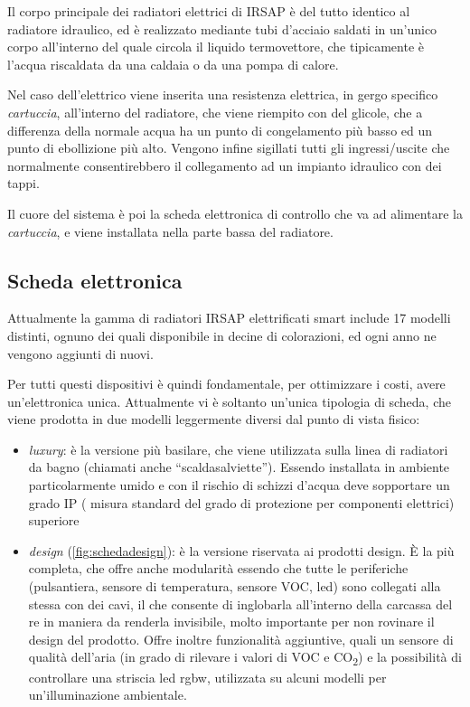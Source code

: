 \documentclass[12pt,a4paper,twoside,titlepage]{book}
\begin{document}
Il corpo principale dei radiatori elettrici di IRSAP è del tutto identico al radiatore idraulico,
ed è realizzato mediante tubi d'acciaio saldati in un'unico corpo all'interno del quale circola 
il liquido termovettore, che tipicamente è l'acqua riscaldata da una caldaia o da una pompa di calore. 

Nel caso dell'elettrico viene inserita una resistenza elettrica, in gergo specifico \textit{cartuccia},
all'interno del radiatore, che viene riempito con del glicole, che a differenza della normale acqua 
ha un punto di congelamento più basso ed un punto di ebollizione più alto. Vengono infine sigillati 
tutti gli ingressi/uscite che normalmente consentirebbero il collegamento ad un impianto idraulico con dei tappi. 

Il cuore del sistema è poi la scheda elettronica di controllo che va ad alimentare la \textit{cartuccia},
e viene installata nella parte bassa del radiatore. 

\subsection{Scheda elettronica}

Attualmente la gamma di radiatori IRSAP elettrificati smart include 17 modelli distinti, 
ognuno dei quali disponibile in decine di colorazioni, ed ogni anno ne vengono aggiunti di nuovi. 

Per tutti questi dispositivi è quindi fondamentale, per ottimizzare i costi, avere un'elettronica 
unica. Attualmente vi è soltanto un'unica tipologia di scheda, che viene prodotta in due modelli 
leggermente diversi dal punto di vista fisico:

\begin{itemize}
    \item \textit{luxury}: è la versione più basilare, che viene utilizzata sulla linea di
        radiatori da bagno (chiamati anche ``scaldasalviette''). Essendo installata in ambiente 
        particolarmente umido e con il rischio di schizzi d'acqua deve sopportare un grado IP (
        misura standard del grado di protezione per componenti elettrici) superiore
    \item \textit{design} (\autoref{fig:schedadesign}): è la versione riservata ai prodotti design. È la più completa,
        che offre anche modularità essendo che tutte le periferiche (pulsantiera, sensore di temperatura,
        sensore VOC, \acrshort{led}) sono collegati alla stessa con dei cavi, il che consente di inglobarla
        all'interno della carcassa del \acrshort{re} in maniera da renderla invisibile, molto importante per non rovinare 
        il design del prodotto. Offre inoltre funzionalità aggiuntive, quali un sensore di qualità
        dell'aria (in grado di rilevare i valori di VOC e CO\textsubscript{2}) e la possibilità di
        controllare una striscia \acrshort{led} \Gls{rgbw}, utilizzata su alcuni modelli per un'illuminazione ambientale.
\end{itemize}
\end{document}
